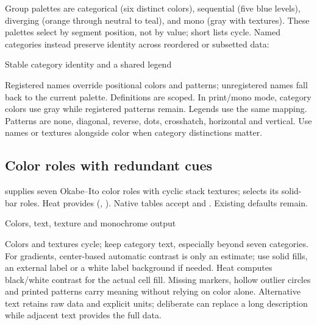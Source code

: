 Group palettes are categorical (six distinct colors), sequential (five blue levels),
diverging (orange through neutral to teal), and mono (gray with textures).
These palettes select by segment position, not by value; short lists cycle.
Named categories instead preserve identity across reordered or subsetted data:
\begin{demo}{Stable category identity and a shared legend}


\end{demo}
Registered names override positional colors and patterns; unregistered names fall
back to the current palette. Definitions are scoped. In print/mono mode, category
colors use gray while registered patterns remain. Legends use the same mapping.
Patterns are none, diagonal, reverse, dots, crosshatch, horizontal and vertical.
Use names or textures alongside color when category distinctions matter.

\subsection{Color roles with redundant cues}
 supplies seven Okabe--Ito color roles with cyclic stack
textures;  selects its solid-bar roles. Heat provides
 (, ). Native tables
accept  and . Existing defaults remain.
\begin{demo}{Colors, text, texture and monochrome output}
\par\medskip
{}
\end{demo}
Colors and textures cycle; keep category text, especially beyond seven categories.
For gradients, center-based automatic contrast is only an estimate; use solid
fills, an external label or a white label background if needed. Heat computes
black/white contrast for the actual cell fill. Missing markers, hollow outlier
circles and printed patterns carry meaning without relying on color alone.
Alternative text retains raw data and explicit units; deliberate  can
replace a long description while adjacent text provides the full data.
